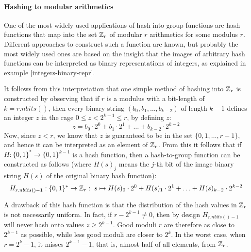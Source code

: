 \paragraph{Hashing to modular arithmetics}\label{hashing-start} One of the most widely used applications of hash-into-group functions are hash functions that map into the set $\mathbb{Z}_r$ of modular $r$ arithmetics for some modulus $r$. Different approaches to construct such a function are known, but probably the most widely used ones are based on the insight that the images of arbitrary hash functions can be interpreted as binary representations of integers, as explained in example \ref{integers-binary-repr}.

It follows from this interpretation that one simple method of hashing into $\mathbb{Z}_r$ is constructed by observing that if $r$ is a modulus with a bit-length of $k=r.nbits()$, then every binary string $(b_0,b_1,\ldots,b_{k-2})$ of length $k-1$ defines an integer $z$ in the rage $0\leq z < 2^{k-1}\leq r $, by defining $z$:
\begin{equation}
z = b_0\cdot 2^0 + b_1\cdot 2^1 + \ldots + b_{k-2}\cdot 2^{k-2}
\end{equation}
Now, since $z<r$, we know that $z$ is guaranteed to be in the set $\{0,1,\ldots,r-1\}$, and hence it can be interpreted as an element of $\mathbb{Z}_r$. From this it follows that if $H:\{0,1\}^*\to\{0,1\}^{k-1}$ is a hash function, then a hash-to-group function can be constructed as follows (where $H(s)_j$ means the $j$-th bit of the image binary string $H(s)$ of the original binary hash function):
\begin{equation}\label{eq:hash-Zr}
H_{r.nbits()-1}: \{0,1\}^* \to \mathbb{Z}_r: \; s \mapsto
H(s)_0\cdot 2^0 + H(s)_1\cdot 2^1 + \ldots + H(s)_{k-2}\cdot 2^{k-2}
\end{equation}

A drawback of this hash function is that the distribution of the hash values in $\mathbb{Z}_r$ is not necessarily uniform. In fact, if $r-2^{k-1}\neq 0$, then by design $H_{r.nbits()-1}$ will never hash onto values $z\geq 2^{k-1}$. Good moduli $r$ are therefore as close to $2^{k-1}$ as possible, while less good moduli are closer to $2^k$. In the worst case, when $r=2^k-1$, it misses $2^{k-1}-1$, that is, almost half of all elements, from $\mathbb{Z}_r$.

